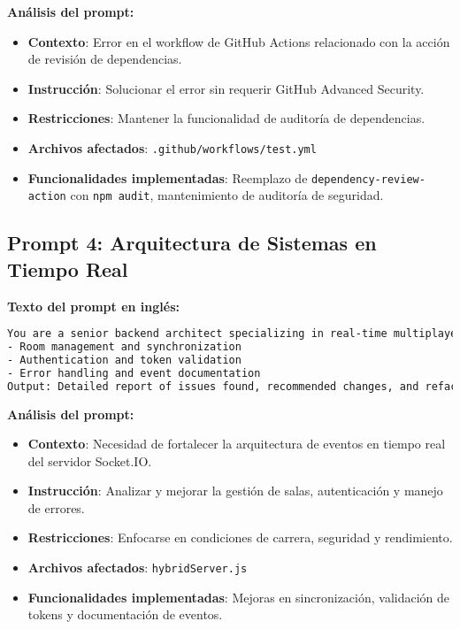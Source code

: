 \documentclass[12pt,a4paper]{article}
\begin{document}
\textbf{Análisis del prompt:}
\begin{itemize}
    \item \textbf{Contexto}: Error en el workflow de GitHub Actions relacionado con la acción de revisión de dependencias.
    \item \textbf{Instrucción}: Solucionar el error sin requerir GitHub Advanced Security.
    \item \textbf{Restricciones}: Mantener la funcionalidad de auditoría de dependencias.
    \item \textbf{Archivos afectados}: \texttt{.github/workflows/test.yml}
    \item \textbf{Funcionalidades implementadas}: Reemplazo de \texttt{dependency-review-action} con \texttt{npm audit}, mantenimiento de auditoría de seguridad.
\end{itemize}

\subsection{Prompt 4: Arquitectura de Sistemas en Tiempo Real}

\textbf{Texto del prompt en inglés:}
\begin{lstlisting}[language=bash]
You are a senior backend architect specializing in real-time multiplayer systems. Given a Socket.IO server that manages game sessions and authentication with Firebase, analiza los event handlers para detectar condiciones de carrera, fallos de seguridad y cuellos de botella de rendimiento. Sugiere e implementa mejoras para:
- Room management and synchronization
- Authentication and token validation
- Error handling and event documentation
Output: Detailed report of issues found, recommended changes, and refactored code snippets.
\end{lstlisting}

\textbf{Análisis del prompt:}
\begin{itemize}
    \item \textbf{Contexto}: Necesidad de fortalecer la arquitectura de eventos en tiempo real del servidor Socket.IO.
    \item \textbf{Instrucción}: Analizar y mejorar la gestión de salas, autenticación y manejo de errores.
    \item \textbf{Restricciones}: Enfocarse en condiciones de carrera, seguridad y rendimiento.
    \item \textbf{Archivos afectados}: \texttt{hybridServer.js}
    \item \textbf{Funcionalidades implementadas}: Mejoras en sincronización, validación de tokens y documentación de eventos.
\end{itemize}
\end{document}
